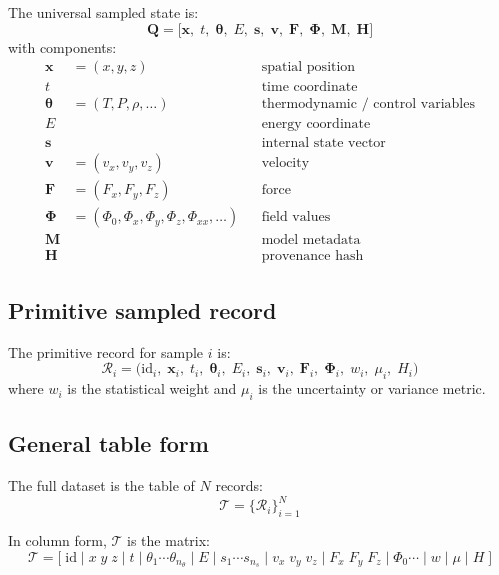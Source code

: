 \documentclass[11pt, a4paper, oneside]{article}
\newcommand{\Rec}{\mathcal{R}}           %
\newcommand{\Tab}{\mathcal{T}}           %
\newcommand{\Qvec}{\mathbf{Q}}           %
\newcommand{\xvec}{\mathbf{x}}
\newcommand{\vvec}{\mathbf{v}}
\newcommand{\Fvec}{\mathbf{F}}
\newcommand{\Phivec}{\bm{\Phi}}
\begin{document}
The universal sampled state is:
\begin{equation}
  \Qvec = \bigl[\xvec,\; t,\; \bm{\theta},\; E,\; \mathbf{s},\;
                \vvec,\; \Fvec,\; \Phivec,\; \mathbf{M},\; \mathbf{H}\bigr]
  \label{eq:Qvec}
\end{equation}
with components:
\begin{align*}
  \xvec &= (x,y,z) & &\text{spatial position} \\
  t     & & &\text{time coordinate} \\
  \bm{\theta} &= (T, P, \rho, \ldots) & &\text{thermodynamic / control variables} \\
  E     & & &\text{energy coordinate} \\
  \mathbf{s} & & &\text{internal state vector} \\
  \vvec &= (v_x, v_y, v_z) & &\text{velocity} \\
  \Fvec &= (F_x, F_y, F_z) & &\text{force} \\
  \Phivec &= (\Phi_0, \Phi_x, \Phi_y, \Phi_z, \Phi_{xx}, \ldots) & &\text{field values} \\
  \mathbf{M} & & &\text{model metadata} \\
  \mathbf{H} & & &\text{provenance hash}
\end{align*}

\subsection{Primitive sampled record}

The primitive record for sample $i$ is:
\begin{equation}
  \Rec_i = \bigl(\mathrm{id}_i,\; \xvec_i,\; t_i,\; \bm{\theta}_i,\; E_i,\;
                  \mathbf{s}_i,\; \vvec_i,\; \Fvec_i,\; \Phivec_i,\;
                  w_i,\; \mu_i,\; H_i\bigr)
  \label{eq:record}
\end{equation}
where $w_i$ is the statistical weight and $\mu_i$ is the uncertainty or
variance metric.

\subsection{General table form}

The full dataset is the table of $N$ records:
\begin{equation}
  \Tab = \{\Rec_i\}_{i=1}^{N}
  \label{eq:table}
\end{equation}

In column form, $\Tab$ is the matrix:
\begin{equation}
  \Tab =
  \bigl[\;
    \mathrm{id}\;\Big|\;
    x\; y\; z\;\Big|\;
    t\;\Big|\;
    \theta_1 \cdots \theta_{n_\theta}\;\Big|\;
    E\;\Big|\;
    s_1 \cdots s_{n_s}\;\Big|\;
    v_x\; v_y\; v_z\;\Big|\;
    F_x\; F_y\; F_z\;\Big|\;
    \Phi_0 \cdots\;\Big|\;
    w\;\Big|\; \mu\;\Big|\; H
  \;\bigr]
  \label{eq:table_col}
\end{equation}
\end{document}
